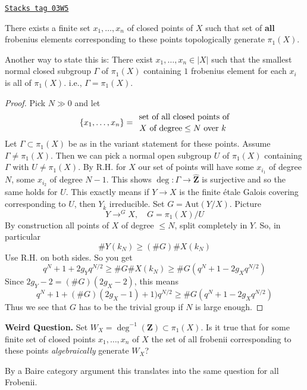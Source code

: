 \begin{proposition}
\label{trace-proposition-finite-set-frobenii-generate-topologically}
\href{https://stacks.math.columbia.edu/tag/03W5}{\texttt{Stacks tag 03W5}}

There exists a finite set $x_1, \ldots, x_n$ of closed points of $X$
such that set of {\bf all} frobenius elements corresponding to these
points topologically generate $\pi_1(X)$.
\end{proposition}

Another way to state this is:
There exist $x_1, \ldots, x_n\in |X|$ such that
the smallest normal closed subgroup $\Gamma$ of $\pi_1(X)$
containing $1$ frobenius element for each $x_i$ is all of $\pi_1(X)$. i.e.,
$\Gamma = \pi_1(X)$.

\begin{proof}
Pick $N\gg 0$ and let
$$
\{x_1, \ldots, x_n\} =
{\text{ set of all closed points of}
\atop X \text{ of degree} \leq N\text{ over } k}
$$
Let $\Gamma\subset \pi_1(X)$ be as in the variant statement for these
points. Assume $\Gamma \neq \pi_1(X)$. Then we can pick a normal open
subgroup $U$ of $\pi_1(X)$ containing $\Gamma$ with
$U \neq \pi_1(X)$. By R.H. for $X$ our set of points will have some
$x_{i_1}$ of degree $N$, some $x_{i_2}$ of degree $N - 1$. This shows
$\deg : \Gamma \to \widehat{\mathbf{Z}}$ is surjective
and so the same holds for $U$. This exactly
means if $Y \to X$ is the finite \'etale Galois covering
corresponding to $U$, then $Y_{\overline{k}}$ irreducible.
Set $G = \text{Aut}(Y/X)$. Picture
$$
Y \to^G X,\quad G = \pi_1(X)/U
$$
By construction all points of $X$ of degree $\leq N$, split
completely in $Y$. So, in particular
$$
\# Y(k_N)\geq (\# G)\# X(k_N)
$$
Use R.H. on both sides. So you get
$$
q^N+1+2g_Yq^{N/2}\geq \# G\# X(k_N)\geq \#
G(q^N+1-2g_Xq^{N/2})
$$
Since $2g_Y-2 = (\# G)(2g_X-2)$, this means
$$
q^N + 1 + (\# G)(2g_X - 1) + 1)q^{N/2}\geq
\# G (q^N + 1 - 2g_Xq^{N/2})
$$
Thus we see that $G$ has to be the trivial group if $N$ is large enough.
\end{proof}

{\bf Weird Question.}
Set $W_X = \deg^{-1}(\mathbf{Z})\subset \pi_1(X)$.
Is it true that for some finite set of closed points $x_1, \ldots, x_n$ of $X$
the set of all frobenii corresponding to these points
{\it algebraically} generate $W_X$?

\medskip\noindent
By a Baire category argument this translates into the same question
for all Frobenii.

